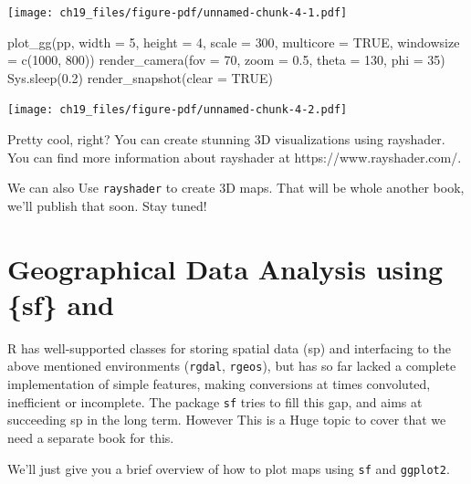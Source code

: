 \documentclass[
  letterpaper,
]{scrbook}
\newenvironment{Shaded}{\begin{snugshade}}{\end{snugshade}}
\newcommand{\AttributeTok}[1]{\textcolor[rgb]{0.40,0.45,0.13}{#1}}
\newcommand{\ConstantTok}[1]{\textcolor[rgb]{0.56,0.35,0.01}{#1}}
\newcommand{\DecValTok}[1]{\textcolor[rgb]{0.68,0.00,0.00}{#1}}
\newcommand{\FloatTok}[1]{\textcolor[rgb]{0.68,0.00,0.00}{#1}}
\newcommand{\FunctionTok}[1]{\textcolor[rgb]{0.28,0.35,0.67}{#1}}
\newcommand{\NormalTok}[1]{\textcolor[rgb]{0.00,0.23,0.31}{#1}}
\begin{document}
\texttt{[image: ch19\_files/figure-pdf/unnamed-chunk-4-1.pdf]}

\begin{Shaded}
\begin{Highlighting}[]
\FunctionTok{plot\_gg}\NormalTok{(pp, }\AttributeTok{width =} \DecValTok{5}\NormalTok{, }\AttributeTok{height =} \DecValTok{4}\NormalTok{, }\AttributeTok{scale =} \DecValTok{300}\NormalTok{, }\AttributeTok{multicore =} \ConstantTok{TRUE}\NormalTok{, }\AttributeTok{windowsize =} \FunctionTok{c}\NormalTok{(}\DecValTok{1000}\NormalTok{, }\DecValTok{800}\NormalTok{))}
\FunctionTok{render\_camera}\NormalTok{(}\AttributeTok{fov =} \DecValTok{70}\NormalTok{, }\AttributeTok{zoom =} \FloatTok{0.5}\NormalTok{, }\AttributeTok{theta =} \DecValTok{130}\NormalTok{, }\AttributeTok{phi =} \DecValTok{35}\NormalTok{)}
\FunctionTok{Sys.sleep}\NormalTok{(}\FloatTok{0.2}\NormalTok{)}
\FunctionTok{render\_snapshot}\NormalTok{(}\AttributeTok{clear =} \ConstantTok{TRUE}\NormalTok{)}
\end{Highlighting}
\end{Shaded}

\texttt{[image: ch19\_files/figure-pdf/unnamed-chunk-4-2.pdf]}

Pretty cool, right? You can create stunning 3D visualizations using
rayshader. You can find more information about rayshader at
https://www.rayshader.com/.

We can also Use \texttt{rayshader} to create 3D maps. That will be whole
another book, we'll publish that soon. Stay tuned!


\chapter{Geographical Data Analysis using \{sf\}
and}\label{geographical-data-analysis-using-sf-and}

R has well-supported classes for storing spatial data (sp) and
interfacing to the above mentioned environments (\texttt{rgdal},
\texttt{rgeos}), but has so far lacked a complete implementation of
simple features, making conversions at times convoluted, inefficient or
incomplete. The package \texttt{sf} tries to fill this gap, and aims at
succeeding sp in the long term. However This is a Huge topic to cover
that we need a separate book for this.

We'll just give you a brief overview of how to plot maps using
\texttt{sf} and \texttt{ggplot2}.
\end{document}
